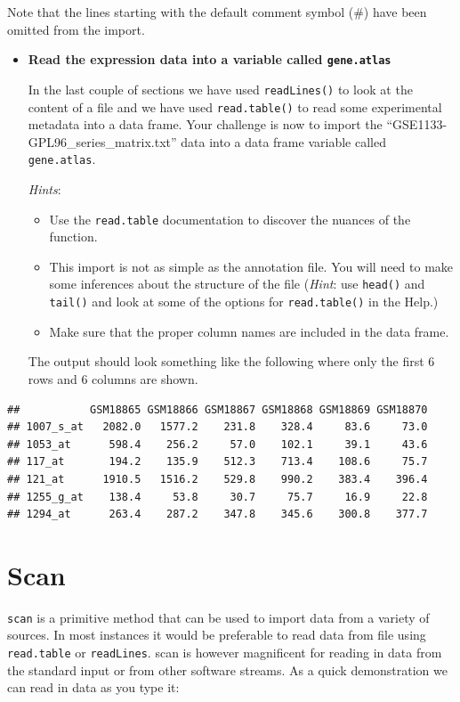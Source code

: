 \documentclass[a4paper]{book}
\providecommand{\tightlist}{%
  \setlength{\itemsep}{0pt}\setlength{\parskip}{0pt}}
\newenvironment{rmdblock}[1]
  {\vspace{1.5em}\begin{shaded*}
  \begin{itemize}
  \renewcommand{\labelitemi}{
    \raisebox{-.7\height}[0pt][0pt]{
      {\setkeys{Gin}{width=3em,keepaspectratio}\texttt{[image: images/\#1]}}
    }
  }
  \item
  }
  {
  \end{itemize}
  \end{shaded*}
  }
\newenvironment{rmdexercise}
  {\begin{rmdblock}{exercise}}
  {\end{rmdblock}}
\begin{document}
Note that the lines starting with the default comment symbol (\#) have
been omitted from the import.

\begin{rmdexercise}
\textbf{Read the expression data into a variable called
\texttt{gene.atlas}}

In the last couple of sections we have used \texttt{readLines()} to look
at the content of a file and we have used \texttt{read.table()} to read
some experimental metadata into a data frame. Your challenge is now to
import the ``GSE1133-GPL96\_series\_matrix.txt'' data into a data frame
variable called \texttt{gene.atlas}.

\emph{Hints}:

\begin{itemize}
\tightlist
\item
  Use the \texttt{read.table} documentation to discover the nuances of
  the function.
\item
  This import is not as simple as the annotation file. You will need to
  make some inferences about the structure of the file (\emph{Hint}: use
  \texttt{head()} and \texttt{tail()} and look at some of the options
  for \texttt{read.table()} in the Help.)
\item
  Make sure that the proper column names are included in the data frame.
\end{itemize}

The output should look something like the following where only the first
6 rows and 6 columns are shown.
\end{rmdexercise}

\begin{verbatim}
##           GSM18865 GSM18866 GSM18867 GSM18868 GSM18869 GSM18870
## 1007_s_at   2082.0   1577.2    231.8    328.4     83.6     73.0
## 1053_at      598.4    256.2     57.0    102.1     39.1     43.6
## 117_at       194.2    135.9    512.3    713.4    108.6     75.7
## 121_at      1910.5   1516.2    529.8    990.2    383.4    396.4
## 1255_g_at    138.4     53.8     30.7     75.7     16.9     22.8
## 1294_at      263.4    287.2    347.8    345.6    300.8    377.7
\end{verbatim}

\section{Scan}\label{scan}

\texttt{scan} is a primitive method that can be used to import data from
a variety of sources. In most instances it would be preferable to read
data from file using \texttt{read.table} or \texttt{readLines}. scan is
however magnificent for reading in data from the standard input or from
other software streams. As a quick demonstration we can read in data as
you type it:
\end{document}
